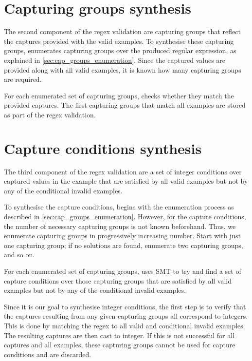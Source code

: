 \section{Capturing groups synthesis}
The second component of the regex validation are capturing groups that reflect the captures provided with the valid examples. To synthesise these capturing groups, \Forest enumerates capturing groups over the produced regular expression, as explained in \autoref{sec:cap_groups_enumeration}. Since the captured values are provided along with all valid examples, it is known how many capturing groups are required.

For each enumerated set of capturing groups, \Forest checks whether they match the provided captures. The first capturing groups that match all examples are stored as part of the regex validation.

\begin{example}
\todo{:)}
\end{example}


\section{Capture conditions synthesis}
The third component of the regex validation are a set of integer conditions over captured values in the example that are satisfied by all valid examples but not by any of the conditional invalid examples.

To synthesise the capture conditions, \Forest begins with the enumeration process as described in \autoref{sec:cap_groups_enumeration}. However, for the capture conditions, the number of necessary capturing groups is not known beforehand. Thus, we enumerate capturing groups in progressively increasing number. Start with just one capturing group; if no solutions are found, enumerate two capturing groups, and so on.

For each enumerated set of capturing groups, \Forest  uses \ac{SMT} to try and find a set of capture conditions over those capturing groups that are satisfied by all valid examples but not by any of the conditional invalid examples.

Since it is our goal to synthesise integer conditions, the first step is to verify that the captures resulting from any given capturing groups all correspond to integers. This is done by matching the regex to all valid and conditional invalid examples. The resulting captures are then cast to integer. If this is not successful for all captures and all examples, these capturing groups cannot be used for capture conditions and are discarded.

